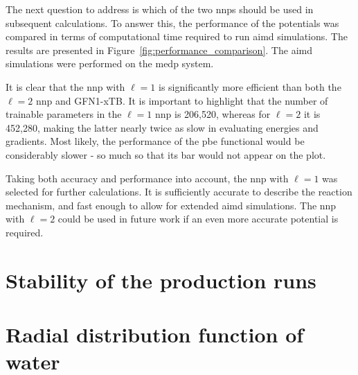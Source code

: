 The next question to address is which of the two \acp{nnp} should be used in subsequent calculations. To answer this, the performance of the potentials was compared in terms of computational time required to run \ac{aimd} simulations. The results are presented in Figure~\ref{fig:performance_comparison}. The \ac{aimd} simulations were performed on the \ac{medp} system.

It is clear that the \ac{nnp} with $\ell=1$ is significantly more efficient than both the $\ell=2$ \ac{nnp} and GFN1-xTB. It is important to highlight that the number of trainable parameters in the $\ell=1$ \ac{nnp} is 206,520, whereas for $\ell=2$ it is 452,280, making the latter nearly twice as slow in evaluating energies and gradients. Most likely, the performance of the \ac{pbe} functional would be considerably slower - so much so that its bar would not appear on the plot.

Taking both accuracy and performance into account, the \ac{nnp} with $\ell=1$ was selected for further calculations. It is sufficiently accurate to describe the reaction mechanism, and fast enough to allow for extended \ac{aimd} simulations. The \ac{nnp} with $\ell=2$ could be used in future work if an even more accurate potential is required.



\section{Stability of the production runs}




\clearpage
\section{Radial distribution function of water}

